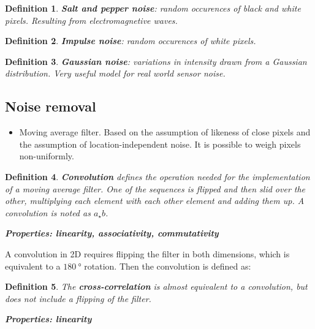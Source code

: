 \documentclass[10pt,a4paper]{scrartcl}
\newtheorem{define}{Definition}
\begin{document}
\begin{multicols*}{2}
\begin{define}
\textbf{Salt and pepper noise}: random occurences of black and white pixels. Resulting from electromagnetive waves.
\end{define}

\begin{define}
\textbf{Impulse noise}: random occurences of white pixels.
\end{define}

\begin{define}
\textbf{Gaussian noise}: variations in intensity drawn from a Gaussian distribution. Very useful model for real world sensor noise.
\end{define}

\subsection{Noise removal}

\begin{itemize}
\item Moving average filter. Based on the assumption of likeness of close pixels and the assumption of location-independent noise. It is possible to weigh pixels non-uniformly.
\end{itemize}


\begin{define}
\textbf{Convolution} defines the operation needed for the implementation of a moving average filter. One of the sequences is flipped and then slid over the other, multiplying each element with each other element and adding them up. A convolution is noted as $a_\star b$.

\textbf{Properties: linearity, associativity, commutativity}
\end{define}

A convolution in 2D requires flipping the filter in both dimensions, which is equivalent to a $\SI{180}{\degree}$ rotation. Then the convolution is defined as:


\begin{define}
The \textbf{cross-correlation} is almost equivalent to a convolution, but does not include a flipping of the filter.

\textbf{Properties: linearity}
\end{define}


\end{multicols*}
\end{document}
